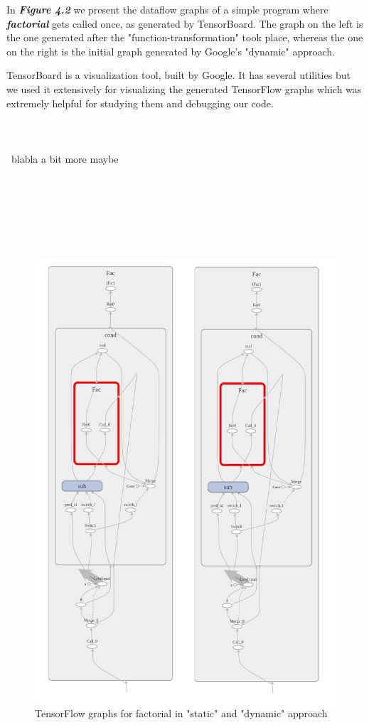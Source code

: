 \documentclass[ack,preface]{dithesis}
\begin{document}
In  \textit{\textbf{Figure 4.2}} we present the dataflow graphs of a simple program where \textit{\textbf{factorial}} gets called once, as generated by TensorBoard. 
The graph on the left is the one generated after the "function-transformation" took place, whereas the one on the right is the initial graph generated by Google's "dynamic" approach.

TensorBoard is a visualization tool, built by Google. It has several utilities but we used it extensively for visualizing the generated TensorFlow graphs which was extremely helpful for studying them and debugging our code.\\\\\\\\\ blabla a bit more maybe \\\\\\\\\\\\\

\begin{figure}
\centering
\includegraphics[scale=0.5]{figures/tf_factorial}
\caption{TensorFlow graphs for factorial in "static" and "dynamic" approach}
\end{figure}
\end{document}
